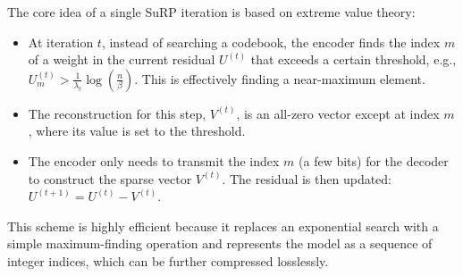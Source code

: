 The core idea of a single SuRP iteration is based on extreme value theory:
\begin{itemize}
    \item At iteration $t$, instead of searching a codebook, the encoder finds the index $m$ of a weight in the current residual $U^{(t)}$ that exceeds a certain threshold, e.g., $U^{(t)}_m > \frac{1}{\lambda_t}\log(\frac{n}{\beta})$. This is effectively finding a near-maximum element.
    \item The reconstruction for this step, $V^{(t)}$, is an all-zero vector except at index $m$, where its value is set to the threshold.
    \item The encoder only needs to transmit the index $m$ (a few bits) for the decoder to construct the sparse vector $V^{(t)}$. The residual is then updated: $U^{(t+1)} = U^{(t)} - V^{(t)}$.
\end{itemize}

This scheme is highly efficient because it replaces an exponential search with a simple maximum-finding operation and represents the model as a sequence of integer indices, which can be further compressed losslessly.

